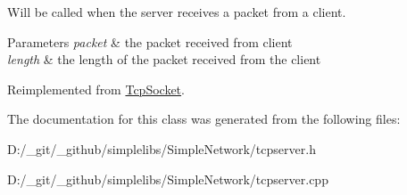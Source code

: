 Will be called when the server receives a packet from a client. 


\begin{DoxyParams}{Parameters}
{\em packet} & the packet received from client \\
\hline
{\em length} & the length of the packet received from the client \\
\hline
\end{DoxyParams}


Reimplemented from \mbox{\hyperlink{class_tcp_socket_a5c2013596b0f1a79502984cfe48ff192}{Tcp\+Socket}}.



The documentation for this class was generated from the following files\+:\begin{DoxyCompactItemize}
\item 
D\+:/\+\_\+git/\+\_\+github/simplelibs/\+Simple\+Network/tcpserver.\+h\item 
D\+:/\+\_\+git/\+\_\+github/simplelibs/\+Simple\+Network/tcpserver.\+cpp\end{DoxyCompactItemize}
